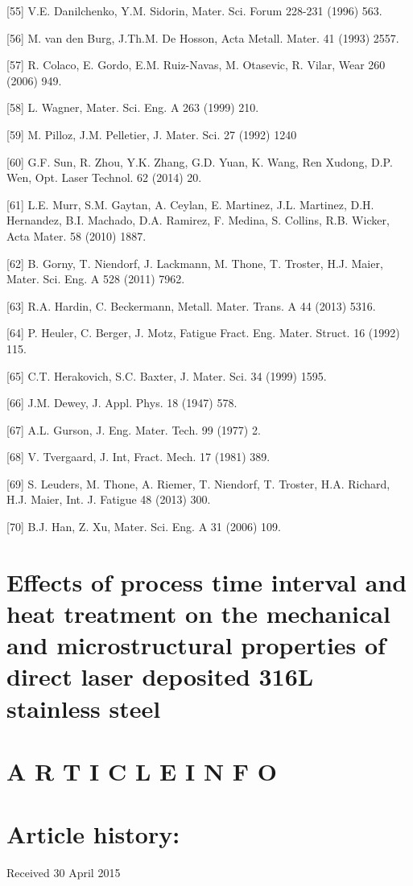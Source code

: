 \documentclass[10pt]{article}
\begin{document}
[55] V.E. Danilchenko, Y.M. Sidorin, Mater. Sci. Forum 228-231 (1996) 563.

[56] M. van den Burg, J.Th.M. De Hosson, Acta Metall. Mater. 41 (1993) 2557.

[57] R. Colaco, E. Gordo, E.M. Ruiz-Navas, M. Otasevic, R. Vilar, Wear 260 (2006) 949.

[58] L. Wagner, Mater. Sci. Eng. A 263 (1999) 210.

[59] M. Pilloz, J.M. Pelletier, J. Mater. Sci. 27 (1992) 1240

[60] G.F. Sun, R. Zhou, Y.K. Zhang, G.D. Yuan, K. Wang, Ren Xudong, D.P. Wen, Opt. Laser Technol. 62 (2014) 20.

[61] L.E. Murr, S.M. Gaytan, A. Ceylan, E. Martinez, J.L. Martinez, D.H. Hernandez, B.I. Machado, D.A. Ramirez, F. Medina, S. Collins, R.B. Wicker, Acta Mater. 58 (2010) 1887.

[62] B. Gorny, T. Niendorf, J. Lackmann, M. Thone, T. Troster, H.J. Maier, Mater. Sci. Eng. A 528 (2011) 7962.

[63] R.A. Hardin, C. Beckermann, Metall. Mater. Trans. A 44 (2013) 5316.

[64] P. Heuler, C. Berger, J. Motz, Fatigue Fract. Eng. Mater. Struct. 16 (1992) 115.

[65] C.T. Herakovich, S.C. Baxter, J. Mater. Sci. 34 (1999) 1595.

[66] J.M. Dewey, J. Appl. Phys. 18 (1947) 578.

[67] A.L. Gurson, J. Eng. Mater. Tech. 99 (1977) 2.

[68] V. Tvergaard, J. Int, Fract. Mech. 17 (1981) 389.

[69] S. Leuders, M. Thone, A. Riemer, T. Niendorf, T. Troster, H.A. Richard, H.J. Maier, Int. J. Fatigue 48 (2013) 300.

[70] B.J. Han, Z. Xu, Mater. Sci. Eng. A 31 (2006) 109.

\section*{Effects of process time interval and heat treatment on the mechanical and microstructural properties of direct laser deposited 316L stainless steel }


\section*{A R T I C L E I N F O}
\section*{Article history:}
Received 30 April 2015
\end{document}
